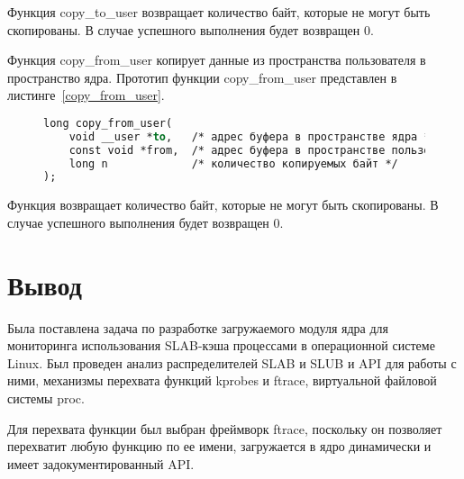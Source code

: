 Функция copy\_to\_user возвращает количество байт, которые не могут быть скопированы.
В случае успешного выполнения будет возвращен 0.

Функция copy\_from\_user копирует данные из пространства пользователя в пространство ядра.
Прототип функции copy\_from\_user представлен в листинге~\ref{copy_from_user}.
\begin{figure}[H]
	\begin{lstlisting}[label=copy_from_user,caption=Прототип функции copy\_to\_user (версия ядра Linux~--- 6.5.13),language=Caml]
long copy_from_user(
	void __user *to,   /* адрес буфера в пространстве ядра */
	const void *from,  /* адрес буфера в пространстве пользователя */
	long n             /* количество копируемых байт */
);
	\end{lstlisting}
\end{figure}

Функция возвращает количество байт, которые не могут быть скопированы.
В случае успешного выполнения будет возвращен 0.

\section*{Вывод}

Была поставлена задача по разработке загружаемого модуля ядра для мониторинга использования SLAB-кэша процессами в операционной системе Linux.
Был проведен анализ распределителей SLAB и SLUB и API для работы с ними, механизмы перехвата функций kprobes и ftrace, виртуальной файловой системы proc.

Для перехвата функции был выбран фреймворк ftrace, поскольку он позволяет перехватит любую функцию по ее имени, загружается в ядро динамически и имеет задокументированный API.
